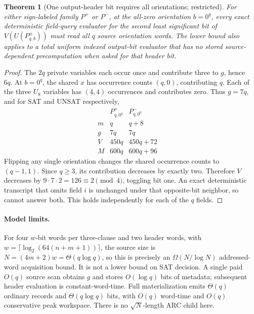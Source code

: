 \documentclass[11pt]{article}
\newtheorem{theorem}{Theorem}
\begin{document}
\begin{theorem}[One output-header bit requires all orientations; restricted]
For either sign-labeled family $P^{+}$ or $P^{-}$, at the all-zero orientation $b=0^q$, every exact deterministic field-query evaluator for the second least significant bit of $V(U(P_{q,b}^{\pm}))$ must read all $q$ source orientation words. The lower bound also applies to a total uniform indexed output-bit evaluator that has no stored source-dependent precomputation when asked for that header bit.
\end{theorem}
\begin{proof}
The $2q$ private variables each occur once and contribute three to $g$, hence $6q$. At $b=0^q$, the shared $x$ has occurrence counts $(q,0)$, contributing $q$. Each of the three $U_8$ variables has $(4,4)$ occurrences and contributes zero. Thus $g=7q$, and for SAT and UNSAT respectively,
\[
\begin{array}{c|cc}
 &P_{q,0^q}^{+}&P_{q,0^q}^{-}\\\hline
m&q&q+8\\
g&7q&7q\\
V&450q&450q+72\\
M&600q&600q+96
\end{array}
\]
Flipping any single orientation changes the shared occurrence counts to $(q-1,1)$. Since $q\ge3$, its contribution decreases by exactly two. Therefore $V$ decreases by $9\cdot7\cdot2=126\equiv2\pmod4$, toggling bit one. An exact deterministic transcript that omits field $i$ is unchanged under that opposite-bit neighbor, so cannot answer both. This holds independently for each of the $q$ fields.
\end{proof}
\paragraph{Model limits.} For four $w$-bit words per three-clause and two header words, with $w=\lceil\log_2(64(n+m+1))\rceil$, the source size is $N=(4m+2)w=\Theta(q\log q)$, so this is precisely an $\Omega(N/\log N)$ addressed-word acquisition bound. It is not a lower bound on SAT decision. A single paid $O(q)$ source scan obtains $g$ and stores $O(\log q)$ bits of metadata; subsequent header evaluation is constant-word-time. Full materialization emits $\Theta(q)$ ordinary records and $\Theta(q\log q)$ bits, with $O(q)$ word-time and $O(q)$ conservative peak workspace. There is no $\sqrt{N}$-length ARC child here.
\end{document}
